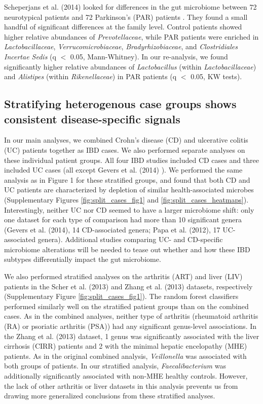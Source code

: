 Scheperjans et al. (2014) looked for differences in the gut microbiome between 72 neurotypical patients and 72 Parkinson's (PAR) patients \cite{par-schep}.
They found a small handful of significant differences at the family level.
Control patients showed higher relative abundances of \textit{Prevotellaceae}, while PAR patients were enriched in \textit{Lactobacillaceae}, \textit{Verrucomicrobiaceae}, \textit{Bradyrhizobiaceae}, and \textit{Clostridiales Incertae Sedis} (q $<$ 0.05, Mann-Whitney).
In our re-analysis, we found significantly higher relative abundances of \textit{Lactobacillus} (within \textit{Lactobacillaceae}) and \textit{Alistipes} (within \textit{Rikenellaceae}) in PAR patients (q $<$ 0.05, KW tests).

\subsection{Stratifying heterogenous case groups shows consistent disease-specific signals}\label{sec:split_cases}

In our main analyses, we combined Crohn's disease (CD) and ulcerative colitis (UC) patients together as IBD cases.
We also performed separate analyses on these individual patient groups.
All four IBD studies included CD cases and three included UC cases (all except Gevers et al. (2014) \cite{ibd-gevers}).
We performed the same analysis as in Figure 1 for these stratified groups, and found that both CD and UC patients are characterized by depletion of similar health-associated microbes (Supplementary Figures \ref{fig:split_cases_fig1} and \ref{fig:split_cases_heatmaps}).
Interestingly, neither UC nor CD seemed to have a larger microbiome shift: only one dataset for each type of comparison had more than 10 significant genera (Gevers et al. (2014), 14 CD-associated genera; Papa et al. (2012), 17 UC-associated genera).
Additional studies comparing UC- and CD-specific microbiome alterations will be needed to tease out whether and how these IBD subtypes differentially impact the gut microbiome.

We also performed stratified analyses on the arthritis (ART) and liver (LIV) patients in the Scher et al. (2013) and Zhang et al. (2013) datasets, respectively \cite{mhe-zhang, ra-littman} (Supplementary Figure \ref{fig:split_cases_fig1}).
The random forest classifiers performed similarly well on the stratified patient groups than on the combined cases.
As in the combined analyses, neither type of arthritis (rheumatoid arthritis (RA) or psoriatic arthritis (PSA)) had any significant genus-level associations.
In the Zhang et al. (2013) dataset, 1 genus was significantly associated with the liver cirrhosis (CIRR) patients and 2 with the minimal hepatic encelopathy (MHE) patients.
As in the original combined analysis, \textit{Veillonella} was associated with both groups of patients.
In our stratified analysis, \textit{Faecalibacterium} was additionally significantly associated with non-MHE healthy controls.
However, the lack of other arthritis or liver datasets in this analysis prevents us from drawing more generalized conclusions from these stratified analyses.

